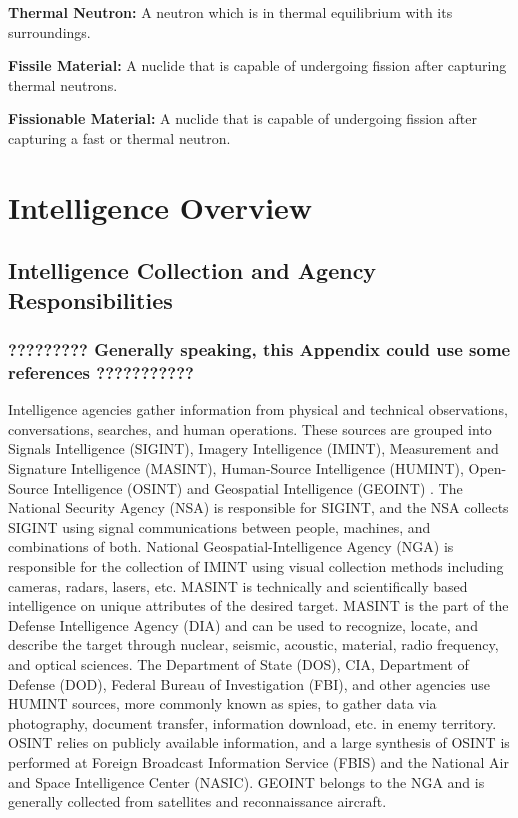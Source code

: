 \documentclass{report}
\begin{document}
\textbf{Thermal Neutron:} A neutron which is in thermal equilibrium with its surroundings. 

\textbf{Fissile Material:} A nuclide that is capable of undergoing fission after capturing thermal neutrons.

\textbf{Fissionable Material:} A nuclide that is capable of undergoing fission after capturing a fast or thermal neutron.




\chapter[Appendix B: Intelligence Overview]{Intelligence Overview}  \label{app:intel}


\section{Intelligence Collection and Agency Responsibilities}

\subsection{?????????  Generally speaking, this Appendix could use some references ???????????}

Intelligence agencies gather information from physical and technical observations, conversations, searches, and human operations. These sources are grouped into Signals Intelligence (SIGINT), Imagery Intelligence (IMINT), Measurement and Signature Intelligence (MASINT), Human-Source Intelligence (HUMINT), Open-Source Intelligence (OSINT) and Geospatial Intelligence (GEOINT) \cite{Intelligen}. The National Security Agency (NSA) is responsible for SIGINT, and the NSA collects SIGINT using signal communications between people, machines, and combinations of both. National Geospatial-Intelligence Agency (NGA) is responsible for the collection of IMINT using visual collection methods including cameras, radars, lasers, etc. MASINT is technically and scientifically based intelligence on unique attributes of the desired target. MASINT is the part of the Defense Intelligence Agency (DIA) and can be used to recognize, locate, and describe the target through nuclear, seismic, acoustic, material, radio frequency, and optical sciences. The Department of State (DOS), CIA, Department of Defense (DOD), Federal Bureau of Investigation (FBI), and other agencies use HUMINT sources, more commonly known as spies, to gather data via photography, document transfer, information download, etc. in enemy territory. OSINT relies on publicly available information, and a large synthesis of OSINT is performed at Foreign Broadcast Information Service (FBIS) and the National Air and Space Intelligence Center (NASIC). GEOINT belongs to the NGA and is generally collected from satellites and reconnaissance aircraft. 
\end{document}
